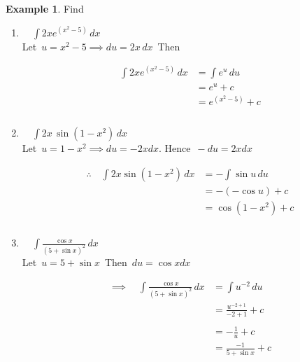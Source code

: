 \documentclass[11pt,a4paper]{article}
\theoremstyle{definition}
\newtheorem{example}[thm]{Example}
\begin{document}
\begin{example}

Find
\begin{enumerate}
\item $\quad \displaystyle{\int 2x e^{(x^2 - 5)}\,dx}$\\

Let $\, u = x^2 - 5 \implies du = 2x\,dx\,$ Then

\begin{align*}
\int 2x e^{\left(x^2 - 5\right)}\,dx & = \int e^u\,du\\
& = e^u + c\\
& = e^{(x^2 - 5)} + c\\\\
\end{align*}









\item $\quad \displaystyle{\int 2x\,\sin \left( 1 - x^2\right)\,dx}$\\

Let $\, u = 1-x^2 \implies du = -2xdx$. Hence $\, -du = 2xdx$

\begin{align*}
\therefore\quad  \int 2x \sin \left( 1 - x^2\right)\,dx & = -\int \sin u \,du\\
& = -\left(-\cos u\right) + c\\
& = \cos \left(1 - x^2\right) + c\\\\
\end{align*}





\item $\quad \displaystyle{\int \frac{\cos x}{\left(5 + \sin x \right)^2}\,dx}$\\

Let $\, u = 5 + \sin x\,$ Then $\,du = \cos x dx$

\begin{align*}
\implies \quad  \int \frac{\cos x}{\left(5 + \sin x \right)^2}\,dx & = \int u^{-2}\,du\\
& = \frac{u^{-2+1}}{-2 + 1} + c\\\\
& = -\frac{1}{u} + c\\
& = \frac{-1}{5 + \sin x} + c\\\\
\end{align*}






\end{enumerate}
\end{example}
\end{document}

